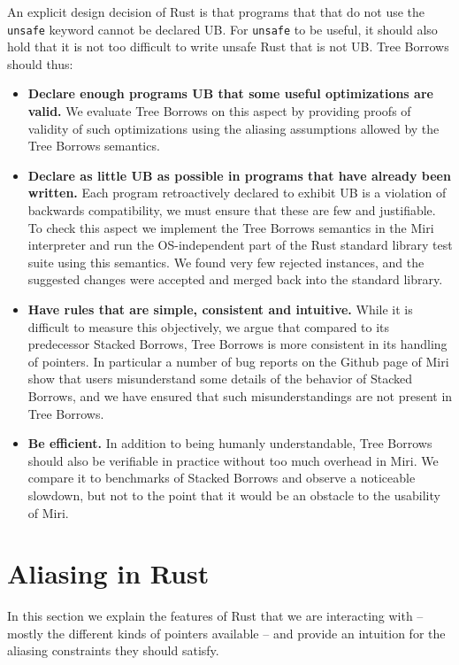 \documentclass[a4paper,11pt]{article}
\theoremstyle{plain}
\theoremstyle{definition}
\theoremstyle{remark}
\newcommand{\tcode}[1]{\texttt{#1}}
\begin{document}
An explicit design decision of Rust is that programs that that do not use the
\tcode{unsafe} keyword cannot be declared UB. For \tcode{unsafe} to be useful,
it should also hold that it is not too difficult to write unsafe Rust that is not
UB. Tree Borrows should thus:
\begin{itemize}
    \item \textbf{Declare enough programs UB that some useful optimizations are valid.}
        We evaluate Tree Borrows on this aspect by providing proofs of validity of such
        optimizations using the aliasing assumptions allowed by the Tree Borrows semantics.
    \item \textbf{Declare as little UB as possible in programs that have already been written.}
        Each program retroactively declared to exhibit UB is a violation of backwards compatibility,
        we must ensure that these are few and justifiable.
        To check this aspect we implement the Tree Borrows semantics in the Miri
        interpreter and run the OS-independent part of the Rust standard library
        test suite using this semantics. We found very few rejected instances, and
        the suggested changes were accepted and merged back into the standard library.
    \item \textbf{Have rules that are simple, consistent and intuitive.}
        While it is difficult to measure this objectively, we argue that compared
        to its predecessor Stacked Borrows, Tree Borrows is more consistent in
        its handling of pointers. In particular a number of bug reports on the
        Github page of Miri show that users misunderstand some details of the
        behavior of Stacked Borrows, and we have ensured that such misunderstandings
        are not present in Tree Borrows.
    \item \textbf{Be efficient.} In addition to being humanly understandable, Tree Borrows
        should also be verifiable in practice without too much overhead in Miri.
        We compare it to benchmarks of Stacked Borrows and observe a noticeable slowdown,
        but not to the point that it would be an obstacle to the usability of Miri.
\end{itemize}

\section{Aliasing in Rust}

In this section we explain the features of Rust that we are interacting with --
mostly the different kinds of pointers available -- and provide an intuition
for the aliasing constraints they should satisfy.
\end{document}
